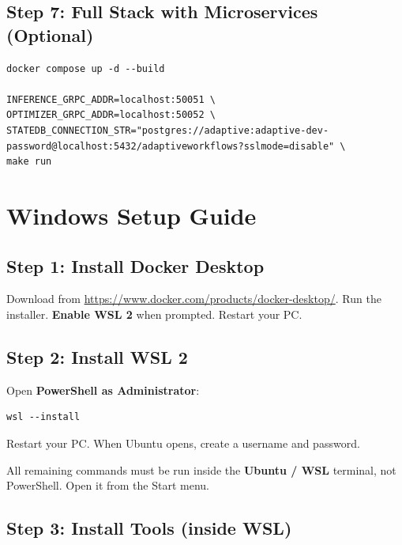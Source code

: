 \documentclass[11pt,a4paper]{article}
\begin{document}
\subsection{Step 7: Full Stack with Microservices (Optional)}

\begin{lstlisting}
docker compose up -d --build

INFERENCE_GRPC_ADDR=localhost:50051 \
OPTIMIZER_GRPC_ADDR=localhost:50052 \
STATEDB_CONNECTION_STR="postgres://adaptive:adaptive-dev-password@localhost:5432/adaptiveworkflows?sslmode=disable" \
make run
\end{lstlisting}

\section{Windows Setup Guide}

\subsection{Step 1: Install Docker Desktop}

Download from \url{https://www.docker.com/products/docker-desktop/}. Run the installer. \textbf{Enable WSL 2} when prompted. Restart your PC.

\subsection{Step 2: Install WSL 2}

Open \textbf{PowerShell as Administrator}:
\begin{lstlisting}
wsl --install
\end{lstlisting}

Restart your PC. When Ubuntu opens, create a username and password.

\begin{warnbox}
All remaining commands must be run inside the \textbf{Ubuntu / WSL} terminal, not PowerShell. Open it from the Start menu.
\end{warnbox}

\subsection{Step 3: Install Tools (inside WSL)}
\end{document}

